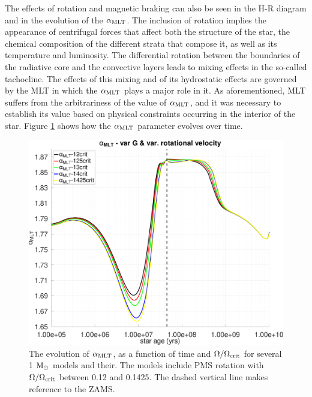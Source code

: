 \documentclass[fleqn,usenatbib]{mnras}
\begin{document}
The effects of rotation and magnetic braking can also be seen in the H-R diagram and in the evolution of the $\alpha_{\mathrm{MLT}}$. The inclusion of rotation implies the appearance of centrifugal forces that affect both the structure of the star, the chemical composition of the different strata that compose it, as well as its temperature and luminosity. The differential rotation between the boundaries of the radiative core and the convective layers leads to mixing effects in the so-called tachocline. The effects of this mixing and of its hydrostatic effects are governed by the MLT in which the $\alpha_{\mathrm{MLT}}$ plays a major role in it. As aforementioned, MLT suffers from the arbitrariness of the value of $\alpha_{\mathrm{MLT}}$, and it was necessary to establish its value based on physical constraints occurring in the interior of the star. Figure \ref{fig:alpha_mlt_var_vel_g3} shows how the $\alpha_{\mathrm{MLT}}$ parameter evolves over time.\par 

\begin{figure}
	\includegraphics[clip,width=\columnwidth]{figures/paper2/alpha_mlt_var_vel_g3.pdf}
    \caption{The evolution of $\alpha_{\mathrm{MLT}}$, as a function of time and $\Omega / \Omega_{\mathrm{crit}}$ for several 1 $\mathrm{M}_\odot$ models and their. The models include PMS rotation with $\Omega / \Omega_{\mathrm{crit}}$ between 0.12 and 0.1425. The dashed vertical line makes reference to the ZAMS.}
    \label{fig:alpha_mlt_var_vel_g3}
\end{figure}
\end{document}
